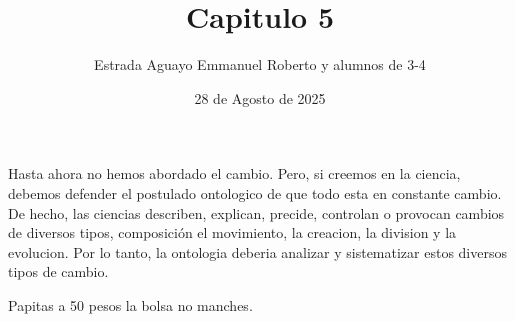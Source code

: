 \documentclass{article}
\title{Capitulo 5}
\author{Estrada Aguayo Emmanuel Roberto y alumnos de 3-4}
\date{28 de Agosto de 2025 }
\begin{document}
\sloppy
\maketitle
\begin{justifying}
    \noindent Hasta ahora no hemos abordado el cambio. Pero, si creemos en la ciencia,
    debemos defender el postulado ontologico de que todo esta en constante cambio. De hecho, 
    las ciencias describen, explican, precide, controlan o provocan cambios de diversos tipos, composición
    el movimiento, la creacion, la division y la evolucion. Por lo tanto, la ontologia deberia analizar y 
    sistematizar estos diversos tipos de cambio.


    Papitas a 50 pesos la bolsa no manches.
\end{justifying}



\printbibliography
\end{document}
